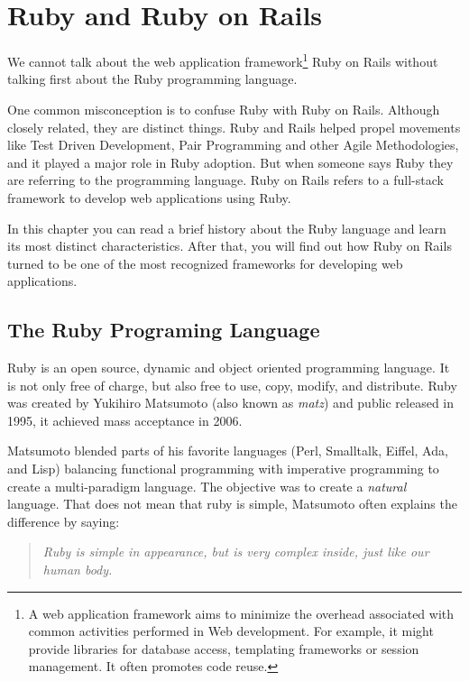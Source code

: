 \thispagestyle{empty}
\chapter{Ruby and Ruby on Rails}\label{chap:ruby_on_rails}

We cannot talk about the 
\textsf{web application framework}\footnote{
  A web application framework aims to minimize the overhead associated with common activities performed in Web development. 
  For example, it might provide libraries for database access, templating frameworks or session management. 
  It often promotes code reuse.
}
Ruby on Rails without talking first about the Ruby programming language.

One common misconception is to confuse Ruby with Ruby on Rails. 
Although closely related, they are distinct things. 
Ruby and Rails helped propel movements like 
Test Driven Development, 
Pair Programming 
and other 
Agile Methodologies, 
and it played a major role in Ruby adoption. 
But when someone says Ruby they are referring to the programming language.
Ruby on Rails refers to a full-stack framework to develop web applications using Ruby.


In this chapter you can read a brief history about the Ruby language
and learn its most distinct characteristics.
After that, you will find out how Ruby on Rails turned to be one of the 
most recognized frameworks for developing web applications. 


\section{The Ruby Programing Language} 
Ruby is an open source, dynamic and object oriented programming language.
It is not only free of charge, but also free to use, copy, modify, and distribute.
Ruby was created by Yukihiro Matsumoto (also known as \emph{matz}) and public released in 1995, 
it achieved mass acceptance in 2006.

Matsumoto blended parts of his favorite languages (Perl, Smalltalk, Eiffel, Ada, and Lisp) 
balancing functional programming with imperative programming 
to create a multi-paradigm language. 
The objective was to create a \emph{natural} language. 
That does not mean that ruby is simple, Matsumoto often explains the difference by saying:

\begin{quote}\emph{
  Ruby is simple in appearance, but is very complex inside, just like our human body.
}\end{quote}

